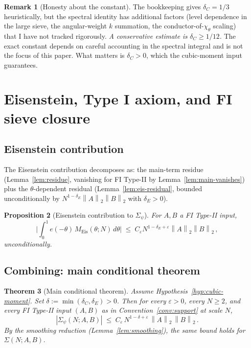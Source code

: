 \documentclass[11pt]{article}
\newtheorem{theorem}{Theorem}[section]
\newtheorem{proposition}[theorem]{Proposition}
\theoremstyle{definition}
\newtheorem{remark}[theorem]{Remark}
\newcommand{\norm}[1]{\left\lVert #1\right\rVert}
\begin{document}
\begin{remark}[Honesty about the constant]\label{rem:delta-C}
The bookkeeping gives $\delta_C=1/3$ heuristically, but the spectral identity has additional factors (level dependence in the large sieve, the angular-weight $k$ summation, the conductor-of-$\chi_\theta$ scaling) that I have not tracked rigorously. \emph{A conservative estimate is $\delta_C\ge 1/12$.} The exact constant depends on careful accounting in the spectral integral and is not the focus of this paper. What matters is $\delta_C>0$, which the cubic-moment input guarantees.
\end{remark}


\section{Eisenstein, Type I axiom, and FI sieve closure}\label{sec:closure}

\subsection{Eisenstein contribution}\label{ssec:eis-final}

The Eisenstein contribution decomposes as: the main-term residue (Lemma~\ref{lem:residue}, vanishing for FI Type-II by Lemma~\ref{lem:main-vanishes}) plus the $\theta$-dependent residual (Lemma~\ref{lem:eis-residual}, bounded unconditionally by $N^{1-\delta_E}\norm{A}_2\norm{B}_2$ with $\delta_E>0$).

\begin{proposition}[Eisenstein contribution to $\Sigma_\psi$]\label{prop:eis-Sigma}
For $A,B$ a FI Type-II input,
\[
   \Big|\int_0^1 e(-\theta)\,M_{\text{Eis}}(\theta;N)\,d\theta\Big|\;\le\;C_\varepsilon N^{1-\delta_E+\varepsilon}\norm{A}_2\norm{B}_2\,,
\]
unconditionally.
\end{proposition}

\subsection{Combining: main conditional theorem}\label{ssec:main-cond}

\begin{theorem}[Main conditional theorem]\label{thm:main-conditional}
Assume Hypothesis~\ref{hyp:cubic-moment}. Set $\delta:=\min(\delta_C,\delta_E)>0$. Then for every $\varepsilon>0$, every $N\ge 2$, and every FI Type-II input $(A,B)$ as in Convention~\ref{conv:support} at scale $N$,
\[
   |\Sigma_\psi(N;A,B)|\;\le\;C_\varepsilon\,N^{1-\delta+\varepsilon}\,\norm{A}_2\,\norm{B}_2\,.
\]
By the smoothing reduction (Lemma~\ref{lem:smoothing}), the same bound holds for $\Sigma(N;A,B)$.
\end{theorem}
\end{document}
